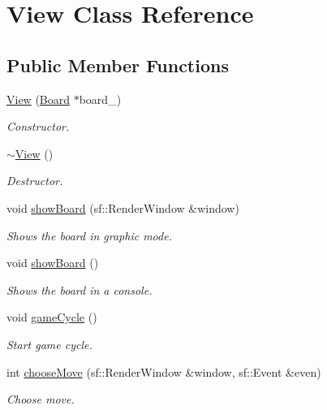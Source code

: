 \hypertarget{class_view}{}\section{View Class Reference}
\label{class_view}
\subsection*{Public Member Functions}
\begin{DoxyCompactItemize}
\item 
\hyperlink{class_view_a3d7a0dbc5015f9ec6389af5148c64a12}{View} (\hyperlink{class_board}{Board} $\ast$board\+\_\+)
\begin{DoxyCompactList}\small\item\em Constructor. \end{DoxyCompactList}\item 
\hyperlink{class_view_ad0dc854db9aabbea98a334dec89f785c}{$\sim$\+View} ()
\begin{DoxyCompactList}\small\item\em Destructor. \end{DoxyCompactList}\item 
void \hyperlink{class_view_ae2b805e0ae8367975099f196e78db6d6}{show\+Board} (sf\+::\+Render\+Window \&window)
\begin{DoxyCompactList}\small\item\em Shows the board in graphic mode. \end{DoxyCompactList}\item 
void \hyperlink{class_view_a871b2d3369d5ac362bdb970be6fbcb07}{show\+Board} ()
\begin{DoxyCompactList}\small\item\em Shows the board in a console. \end{DoxyCompactList}\item 
void \hyperlink{class_view_a309248be7c4916ed9175555b85c9f756}{game\+Cycle} ()
\begin{DoxyCompactList}\small\item\em Start game cycle. \end{DoxyCompactList}\item 
int \hyperlink{class_view_a0194d9f27fed5e1996e6959a085ef921}{choose\+Move} (sf\+::\+Render\+Window \&window, sf\+::\+Event \&even)
\begin{DoxyCompactList}\small\item\em Choose move. \end{DoxyCompactList}\item 

\end{DoxyCompactItemize}
